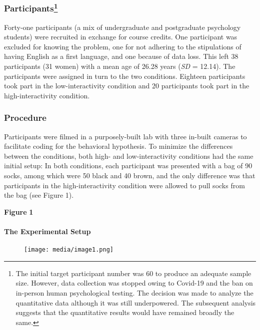 \documentclass{article}
\begin{document}
\subsubsection{Participants\footnote{The initial target participant number was 60 to produce an adequate sample size. However, data collection was stopped owing to Covid-19 and the ban on in-person human psychological testing. The decision was made to analyze the quantitative data although it was still underpowered. The subsequent analysis suggests that the quantitative results would have remained broadly the same. }}

Forty-one participants (a mix of undergraduate and postgraduate psychology students) were recruited in exchange for course credits. One participant was excluded for knowing the problem, one for not adhering to the stipulations of having English as a first language, and one because of data loss. This left 38 participants (31 women) with a mean age of 26.28 years (\emph{SD} = 12.14). The participants were assigned in turn to the two conditions. Eighteen participants took part in the low-interactivity condition and 20 participants took part in the high-interactivity condition. 

\subsubsection{Procedure}

Participants were filmed in a purposely-built lab with three in-built cameras to facilitate coding for the behavioral hypothesis. To minimize the differences between the conditions, both high- and low-interactivity conditions had the same initial setup: In both conditions, each participant was presented with a bag of 90 socks, among which were 50 black and 40 brown, and the only difference was that participants in the high-interactivity condition were allowed to pull socks from the bag (see Figure 1). 

\textbf{Figure }\textbf{1}

\paragraph{The Experimental Setup }


\begin{figure}

  \texttt{[image: media/image1.png]}
\caption{}
\label{}


\end{figure}
\end{document}
